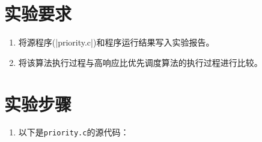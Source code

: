 \documentclass[c5size,a4paper,nofonts]{ctexart}
\begin{document}
\section{实验要求}
\begin{enumerate}[label={(\arabic*)}]
\item 将源程序(|priority.c|)和程序运行结果写入实验报告。
\item 将该算法执行过程与高响应比优先调度算法的执行过程进行比较。
\end{enumerate}

\section{实验步骤}

\begin{enumerate}

\item 以下是{\tt priority.c}的源代码：

{\small\linespread{1}}

\begin{figure}[htp]
\end{figure}

\end{enumerate}
\end{document}
